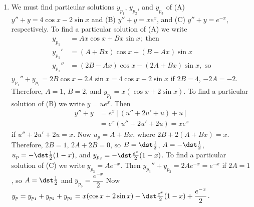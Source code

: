 \documentclass[openany]{book}
\newenvironment{sectionSolutions}{
 \begin{enumerate}[item-label={\thesection.\arabic{enumi}.}]
}{
 \end{enumerate}
}
\begin{document}
\begin{sectionSolutions}
\item
We must find particular solutions $y_{p_1}$, $y_{p_2}$, and $y_{p_3}$
of
(A) $y''+y=4\cos x-2\sin x$ and
(B) $y''+y=xe^x$, and
(C) $y''+y=e^{-x}$, respectively.
To find a particular solution of (A) we write
\begin{align*}
y_{p_1}&=Ax\cos x+Bx\sin x; \text{ then}\\
y_{p_1}'&=(A+Bx)\cos x+(B-Ax)\sin x\\
y_{p_1}''&=(2B-Ax)\cos x-(2A+Bx)\sin x, \text{ so}
\end{align*}
$y_{p_1}''+y_{p_1}=2B\cos x-2A\sin x=4\cos x-2\sin x$ if $2B=4$,
$-2A=-2$. Therefore, $A=1$, $B=2$, and $y_{p_1}=x(\cos x+2\sin x)$.
To find a particular solution of (B) we write $y=ue^x$. Then
\begin{align*}
y''+y&=e^x\left[(u''+2u'+u)+u\right]\\
&=e^x(u''+2u'+2u)=xe^x
\end{align*}
if $u''+2u'+2u=x$. Now $u_p=A+Bx$, where $2B+2(A+Bx)=x$. Therefore,
$2B=1$, $2A+2B=0$, so $B=\dst\frac{1}{2}$, $A=-\dst\frac{1}{2}$,
$u_p=-\dst\frac{1}{2}(1-x)$, and $y_{p_2}=-\dst\frac{e^x}{2}(1-x)$. To
find a particular solution of (C) we write $y_{p_3}=Ae^{-x}$. Then
$y_{p_3}''+y_{p_3}=2Ae^{-x}=e^{-x}$ if $2A=1$, so $A=\dst\frac{1}{2}$
and $y_{p_3}=\dfrac{e^{-x}}{2}$ Now $y_p=y_{p_1}+y_{p_2}+y_{p_3}=
x(\cos x+2\sin x)-\dst\frac{e^x}{2}(1-x)+\dfrac{e^{-x}}{2}$.



\end{sectionSolutions}
\end{document}
